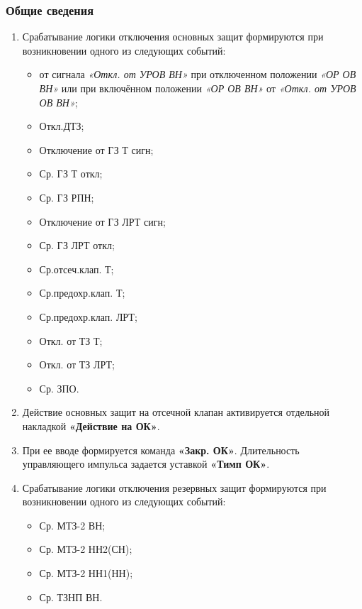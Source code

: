 \color{black}

\subsubsection{Общие сведения}

\begin{enumerate}[label=\arabic{section}.\arabic{subsection}.\arabic{subsubsection}.\arabic*,  align=left, labelsep=4pt, leftmargin=0pt, itemindent=57pt]

\item
Срабатывание логики отключения основных защит формируются при возникновении одного из
следующих событий:
\begin{itemize}
\item от сигнала \textit{«Откл. от УРОВ ВН»} при отключенном положении \textit{«ОР ОВ ВН»} или при включённом положении \textit{«ОР ОВ ВН»} от \textit{«Откл. от УРОВ ОВ ВН»};
\item Откл.ДТЗ;
\item Отключение от ГЗ Т сигн;
\item Ср. ГЗ Т откл;
\item Ср. ГЗ РПН;
\item Отключение от ГЗ ЛРТ сигн;
\item Ср. ГЗ ЛРТ откл;
\item Ср.отсеч.клап. Т;
\item Ср.предохр.клап. Т;
\item Ср.предохр.клап. ЛРТ;
\item Откл. от ТЗ Т;
\item Откл. от ТЗ ЛРТ;
\item Ср. ЗПО.
\end{itemize}

\item
Действие основных защит на отсечной клапан активируется отдельной накладкой \textbf{«Действие на
ОК»}.

\item
При ее вводе формируется команда \textbf{«Закр. ОК»}. Длительность управляющего импульса задается
уставкой \textbf{«Тимп ОК»}.

\item
Срабатывание логики отключения резервных защит формируются при возникновении одного из
следующих событий:
\begin{itemize}
\item Ср. МТЗ-2 ВН;
\item Ср. МТЗ-2 НН2(СН);
\item Ср. МТЗ-2 НН1(НН);
\item Ср. ТЗНП ВН.
\end{itemize}


\end{enumerate}
